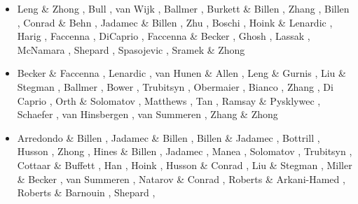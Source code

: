 \begin{itemize}
\begin{scriptsize}
\begin{itemize}
\item[\twothousandten] Leng \& Zhong \cite{lezh10}, Bull \etal \cite{bumb10}, 
                 van Wijk \etal \cite{vabv10}, Ballmer \etal  \cite{baiv10},
                 Burkett \& Billen \cite{bubi10}, Zhang \etal \cite{zhzl10},
                 Billen \cite{bill10}, Conrad \& Behn \cite{cobe10},
                 Jadamec \& Billen \cite{jabi10}, Zhu \etal \cite{zhst10},
                 Boschi \etal \cite{bofb10}, Hoink \& Lenardic \cite{hole10},
                 Harig \etal \cite{hazs10}, Faccenna \cite{fabl10},
                 DiCaprio \etal \cite{dimg10}, Faccenna \& Becker \cite{fabe10},
                 Ghosh \etal \cite{ghbz10}, Lassak \etal \cite{lamg10},
                 McNamara \etal \cite{mcgr10}, Shepard \etal \cite{shml10},
                 Spasojevic \etal \cite{spgs10a,spgs10b}, Sramek \& Zhong \cite{srzh10}
\item[\twothousandeleven] Becker \& Faccenna \cite{befa11}, Lenardic \etal \cite{lemj11},
                    van Hunen \& Allen \cite{vaal11}, Leng \& Gurnis \cite{legu11},
                    Liu \& Stegman \cite{list11}, Ballmer \etal \cite{baiv11},
                    Bower \etal \cite{bowg11}, Trubitsyn \etal \cite{tree11},
                    Obermaier \etal \cite{obbh11}, Bianco \etal \cite{bics11}, 
                    Zhang \etal \cite{zhxy11}, Di Caprio \cite{digm11}, 
                    Orth \& Solomatov \cite{orso11}, Matthews \etal \cite{mahg11},
                    Tan \etal \cite{talz11}, Ramsay \& Pysklywec \cite{rapy11},
                    Schaefer \etal \cite{scbb11}, van Hinsbergen \cite{vasd11},
                    van Summeren \etal \cite{vacg11}, Zhang \& Zhong \cite{zhzh11}
\item[\twothousandtwelve] Arredondo \& Billen \cite{arbi12}, Jadamec \& Billen \cite{jabi12},
                    Billen \& Jadamec \cite{bija12}, Bottrill \etal \cite{bova12},
                    Husson \etal \cite{hucf12}, Zhong \etal \cite{zhym12},
                    Hines \& Billen \cite{hibi12}, Jadamec \etal \cite{jabk12},
                    Manea \etal \cite{mapm12}, Solomatov \cite{solo12}, 
                    Trubitsyn \cite{trub12}, Cottaar \& Buffett \cite{cobu12},
                    Han \etal \cite{hats12}, Hoink \etal \cite{holr12},
                    Husson \& Conrad \cite{huco12}, Liu \& Stegman \cite{list12},
                    Miller \& Becker \cite{mibe12}, van Summeren \etal \cite{vacl12},
                    Natarov \& Conrad \cite{naco12}, Roberts \& Arkani-Hamed \cite{roar12},
                    Roberts \& Barnouin \cite{roba12}, Shepard \etal \cite{shlm12},

\end{itemize}
\end{scriptsize}
\end{itemize}
